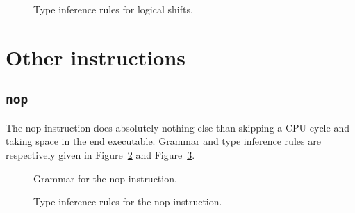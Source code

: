 \begin{figure}[H]
	\centering


	\caption{Type inference rules for logical shifts.}
	\label{fig:nstar-instructionset-registers-logical-shifts-typerules}
\end{figure}

\section{Other instructions}\label{sec:nstar-instructionset-other}

\subsection{\texttt{nop}}\label{subsec:nstar-instructionset-other-nop}

The {\Iformat nop} instruction does absolutely nothing else than skipping a CPU cycle and taking space in the end executable.
Grammar and type inference rules are respectively given in Figure~\ref{fig:nstar-instructionset-other-nop-grammar} and Figure~\ref{fig:nstar-instructionset-other-nop-typerules}.

\begin{figure}[H]
	\centering


	\caption{Grammar for the {\Iformat nop} instruction.}
	\label{fig:nstar-instructionset-other-nop-grammar}
\end{figure}

\begin{figure}[H]
	\centering


	\caption{Type inference rules for the {\Iformat nop} instruction.}
	\label{fig:nstar-instructionset-other-nop-typerules}
\end{figure}

